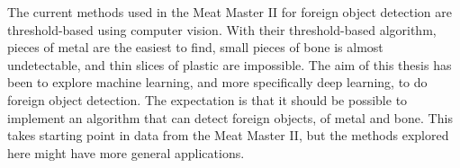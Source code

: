 The current methods used in the Meat Master II for foreign object detection are threshold-based using computer vision.
With their threshold-based algorithm, pieces of metal are the easiest to find, small pieces of bone is almost undetectable, and thin slices of plastic are impossible.
The aim of this thesis has been to explore machine learning, and more specifically deep learning, to do foreign object detection.
The expectation is that it should be possible to implement an algorithm that can detect foreign objects, of metal and bone.
This takes starting point in data from the Meat Master II, but the methods explored here might have more general applications.

